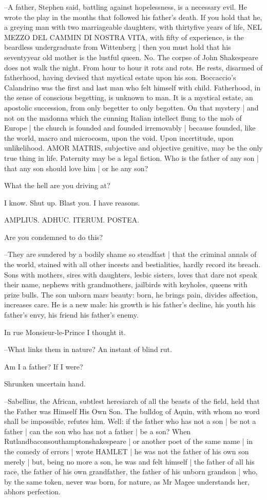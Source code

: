 --A father,
Stephen said,
battling against hopelessness,
is a necessary evil.
He wrote the play in the months that followed his father's death.
If you hold that he,
a greying man with two marriageable daughters,
with thirtyfive years of life,
NEL MEZZO DEL CAMMIN DI NOSTRA VITA,
with fifty of experience,
is the beardless undergraduate from Wittenberg |
then you must hold that his seventyyear old mother is the lustful queen.
No.
The corpse of John Shakespeare does not walk the night.
From hour to hour it rots and rots.
He rests,
disarmed of fatherhood,
having devised that mystical estate upon his son.
Boccaccio's Calandrino was the first and last man who felt himself with child.
Fatherhood,
in the sense of conscious begetting,
is unknown to man.
It is a mystical estate,
an apostolic succession,
from only begetter to only begotten.
On that mystery |
and not on the madonna which the cunning Italian intellect flung to the mob of Europe |
the church is founded and founded irremovably |
because founded,
like the world,
macro and microcosm,
upon the void.
Upon incertitude,
upon unlikelihood.
AMOR MATRIS,
subjective and objective genitive,
may be the only true thing in life.
Paternity may be a legal fiction.
Who is the father of any son |
that any son should love him |
or he any son?

What the hell are you driving at?

I know.
Shut up.
Blast you.
I have reasons.

AMPLIUS.
ADHUC.
ITERUM.
POSTEA.

Are you condemned to do this?

--They are sundered by a bodily shame so steadfast |
that the criminal annals of the world,
stained with all other incests and bestialities,
hardly record its breach.
Sons with mothers,
sires with daughters,
lesbic sisters,
loves that dare not speak their name,
nephews with grandmothers,
jailbirds with keyholes,
queens with prize bulls.
The son unborn mars beauty:
born,
he brings pain,
divides affection,
increases care.
He is a new male:
his growth is his father's decline,
his youth his father's envy,
his friend his father's enemy.

In rue Monsieur-le-Prince
I thought it.

--What links them in nature?
An instant of blind rut.

Am I a father?
If I were?

Shrunken uncertain hand.

--Sabellius, the African,
subtlest heresiarch of all the beasts of the field,
held that the Father was Himself His Own Son.
The bulldog of Aquin,
with whom no word shall be impossible,
refutes him.
Well:
if the father who has not a son |
be not a father |
can the son who has not a father |
be a son?
When Rutlandbaconsouthamptonshakespeare |
or another poet of the same name |
in the comedy of errors |
wrote HAMLET |
he was not the father of his own son merely |
but,
being no more a son,
he was and felt himself |
the father of all his race,
the father of his own grandfather,
the father of his unborn grandson |
who,
by the same token,
never was born,
for nature,
as Mr Magee understands her,
abhors perfection.

